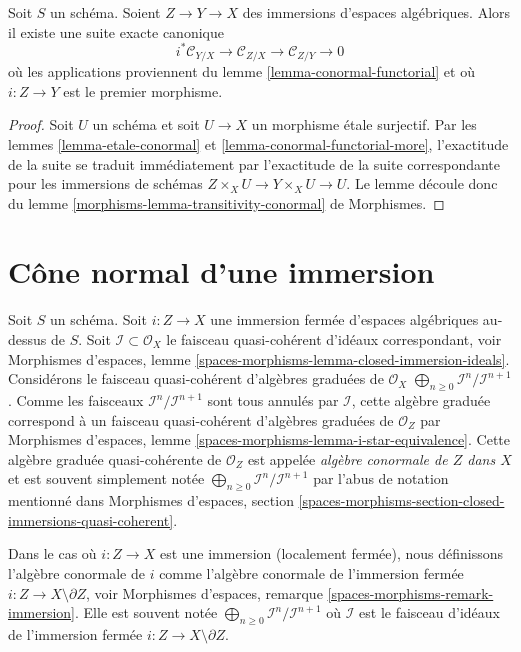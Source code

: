\begin{lemma}
\label{lemma-transitivity-conormal}
Soit $S$ un schéma.
Soient $Z \to Y \to X$ des immersions d'espaces algébriques.
Alors il existe une suite exacte canonique
$$
i^*\mathcal{C}_{Y/X} \to
\mathcal{C}_{Z/X} \to
\mathcal{C}_{Z/Y} \to 0
$$
où les applications proviennent du
lemme \ref{lemma-conormal-functorial}
et où $i : Z \to Y$ est le premier morphisme.
\end{lemma}

\begin{proof}
Soit $U$ un schéma et soit $U \to X$ un morphisme \'etale surjectif. Par
les lemmes \ref{lemma-etale-conormal} et \ref{lemma-conormal-functorial-more},
l'exactitude de la suite se traduit immédiatement par
l'exactitude de la suite correspondante pour les immersions de schémas
$Z \times_X U \to Y \times_X U \to U$. Le lemme découle donc du
lemme \ref{morphisms-lemma-transitivity-conormal} de Morphismes.
\end{proof}








\section{Cône normal d'une immersion}
\label{section-normal-cone}

\noindent
Soit $S$ un schéma. Soit $i : Z \to X$ une immersion fermée d'espaces algébriques
au-dessus de $S$. Soit $\mathcal{I} \subset \mathcal{O}_X$ le
faisceau quasi-cohérent d'idéaux correspondant, voir
Morphismes d'espaces, lemme
\ref{spaces-morphisms-lemma-closed-immersion-ideals}.
Considérons le faisceau quasi-cohérent d'algèbres graduées de $\mathcal{O}_X$
$\bigoplus_{n \geq 0} \mathcal{I}^n/\mathcal{I}^{n + 1}$.
Comme les faisceaux $\mathcal{I}^n/\mathcal{I}^{n + 1}$
sont tous annulés par $\mathcal{I}$, cette algèbre graduée
correspond à un faisceau quasi-cohérent d'algèbres graduées de $\mathcal{O}_Z$ par
Morphismes d'espaces, lemme \ref{spaces-morphisms-lemma-i-star-equivalence}.
Cette algèbre graduée quasi-cohérente de $\mathcal{O}_Z$ est appelée
{\it algèbre conormale de $Z$ dans $X$} et est souvent simplement notée
$\bigoplus_{n \geq 0} \mathcal{I}^n/\mathcal{I}^{n + 1}$
par l'abus de notation mentionné dans
Morphismes d'espaces, section
\ref{spaces-morphisms-section-closed-immersions-quasi-coherent}.

\medskip\noindent
Dans le cas où $i : Z \to X$ est une immersion (localement fermée), nous définissons l'algèbre conormale
de $i$ comme l'algèbre conormale de l'immersion fermée
$i : Z \to X \setminus \partial Z$, voir Morphismes d'espaces, remarque
\ref{spaces-morphisms-remark-immersion}.
Elle est souvent notée
$\bigoplus_{n \geq 0} \mathcal{I}^n/\mathcal{I}^{n + 1}$
où $\mathcal{I}$ est le faisceau d'idéaux
de l'immersion fermée $i : Z \to X \setminus \partial Z$.

